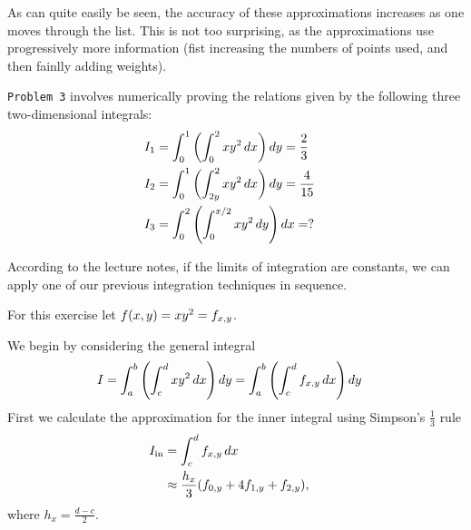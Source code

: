 \documentclass[12pt]{article}
\newenvironment{ex}[2][Exercise]{\begin{trivlist}
\item[\hskip \labelsep {\bfseries #1}\hskip \labelsep {\bfseries #2.}]}{\end{trivlist}}
\newenvironment{sol}[1][Solution]{\begin{trivlist}
\item[\hskip \labelsep {\bfseries #1:}]}{\end{trivlist}}
\DeclarePairedDelimiter\rb{(}{)}
\begin{document}
As can quite easily be seen, the accuracy of these approximations increases as one moves through the list. This is not too surprising, as the approximations use progressively more information (fist increasing the numbers of points used, and then fainlly adding weights).

\newpage

\begin{ex}
    3
\end{ex}

\texttt{Problem 3} involves numerically proving the relations given by the following three two-dimensional integrals:
\begin{align}
    I_{1} & =  \int_{0}^{1} { \rb*{\int_{0}^{2} {x y^{2}} \,d x}} \,d y  = \frac{2}{3} &\\
    I_{2} & =  \int_{0}^{1} {\rb*{ \int_{2y}^{2} {x y^{2}} \,d x}} \,d y  =  \frac{4}{15} &\\
    I_{3} & = \int_{0}^{2} { \rb*{ \int_{0}^{x/2} {x y^{2}} \,d y}} \,d x  =  ? 
\end{align}

\begin{sol}  \end{sol}

According to the lecture notes, if the limits of integration are constants, we can apply one of our previous integration techniques in sequence.

For this exercise let \(f \rb*{x, y} = x y^{2} = f_{x,y}\).

We begin by considering the general integral
\begin{align*}
    I & = \int_{a}^{b} { \rb*{\int_{c}^{d} {x y^{2}} \,d x}} \,d y  = 
    \int_{a}^{b} { \rb*{\int_{c}^{d} {f_{x,y}} \,d x}} \,d y &\\
\end{align*}
First we calculate the approximation for the inner integral using Simpson's \(\frac{1}{3}\) rule
\begin{align*}
    I_{\text{in} } & =  \int_{c}^{d} {f_{x,y}} \,d x &\\
     & \approx \frac{h_{x}}{3} \rb*{f_{0,y} + 4 f_{1,y} + f_{2,y}}, 
\end{align*}
where \(h_{x}  =  \frac{d- c}{2}\).
\end{document}
